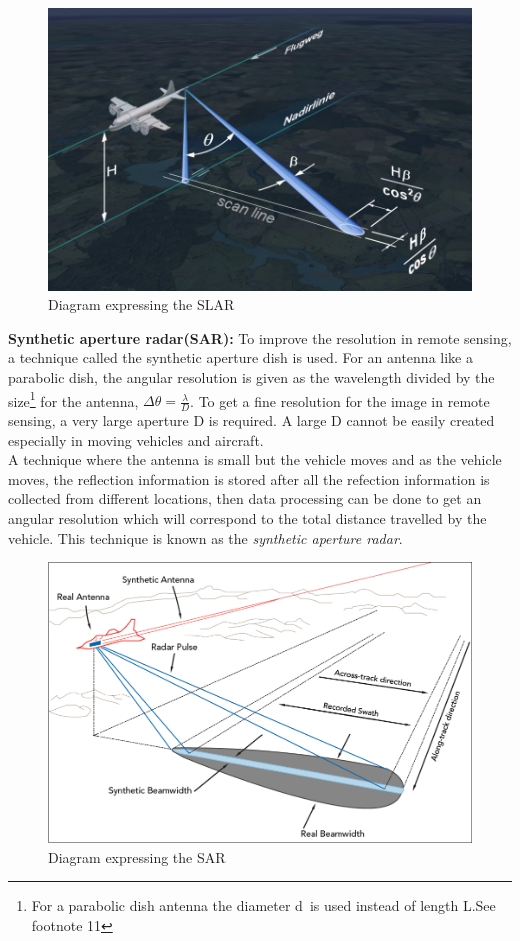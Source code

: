 \begin{figure}[h]
\centering
\includegraphics[scale=0.2]{./graphics/SLAR-resolution}
\caption{Diagram expressing the SLAR}
\end{figure}
\textbf{Synthetic aperture radar(SAR):} To improve the resolution in remote sensing, a technique called the synthetic aperture dish is used. For an antenna like a parabolic dish, the angular resolution is given as the wavelength divided by the size\footnote{For a parabolic dish antenna the diameter \textquotesingle d\textquotesingle \ is used instead of length \textquotesingle L\textquotesingle.See footnote 11} for the antenna, $\Delta \theta = \frac{\lambda}{D}$. To get a fine resolution for the image in remote sensing, a very large aperture D is required. A large D cannot be easily created especially in moving vehicles and aircraft.\\

A technique where the antenna is small but the vehicle moves and as the vehicle moves, the reflection information is stored after all the refection information is collected from different locations, then data processing can be done to get an angular resolution which will correspond to the total distance travelled by the vehicle. This technique is known as the \textit{synthetic aperture radar}.
\begin{figure}[h]
\centering
\includegraphics[scale=0.3]{./graphics/sar2}
\caption{Diagram expressing the SAR}
\end{figure}

